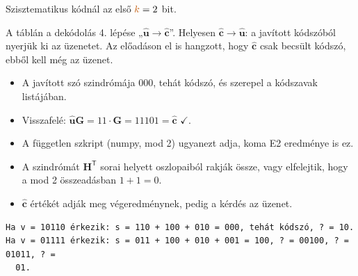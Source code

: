 \begin{center}\end{center}

Szisztematikus kódnál az első ${\cb{k}}=2$ bit.

\begin{center}\end{center}
\begin{figyelem}[Javítás]
A táblán a dekódolás 4. lépése „$\hat{\mathbf u}\to\hat{\mathbf c}$”. Helyesen $\hat{\mathbf c}\to\hat{\mathbf u}$: a javított kódszóból nyerjük ki az üzenetet. Az előadáson el is hangzott, hogy $\hat{\mathbf c}$ csak becsült kódszó, ebből kell még az üzenet.
\end{figyelem}
\begin{eredmeny}

\begin{center}\end{center}
\end{eredmeny}
\begin{tipp}[Ellenőrzés]
\begin{itemize}
\item A javított szó szindrómája 000, tehát kódszó, és szerepel a kódszavak listájában.
\item Visszafelé: $\hat{\mathbf u}\mathbf G=11\cdot\mathbf G=11101=\hat{\mathbf c}$ $\checkmark$.
\item A független szkript (numpy, mod 2) ugyanezt adja, koma E2 eredménye is ez.
\end{itemize}
\end{tipp}
\begin{figyelem}
\begin{itemize}
\item A szindrómát $\mathbf H^{\mathsf T}$ sorai helyett oszlopaiból rakják össze, vagy elfelejtik, hogy a mod 2 összeadásban $1+1=0$.
\item $\hat{\mathbf c}$ értékét adják meg végeredménynek, pedig a kérdés az üzenet.
\end{itemize}
\end{figyelem}
\begin{tipp}
\small
\begin{verbatim}
Ha v = 10110 érkezik: s = 110 + 100 + 010 = 000, tehát kódszó, ? = 10.
Ha v = 01111 érkezik: s = 011 + 100 + 010 + 001 = 100, ? = 00100, ? = 01011, ? =
  01.
\end{verbatim}
\end{tipp}

